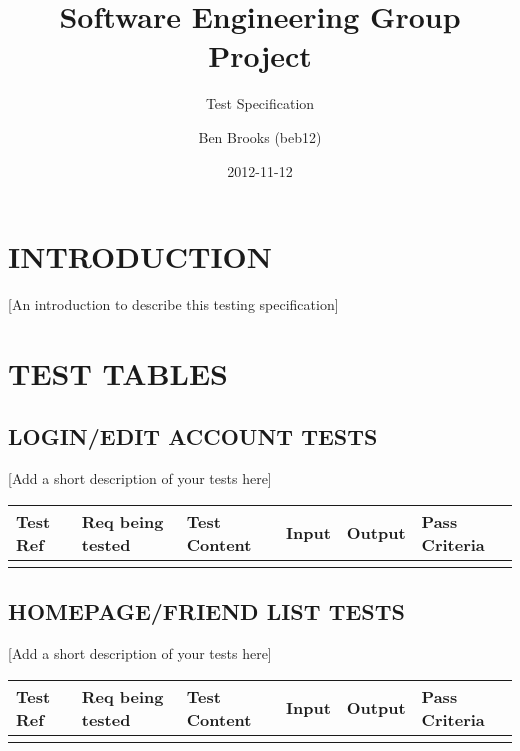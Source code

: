 \documentclass{project}
\begin{document}
\title{Software Engineering Group Project}
\subtitle{Test Specification}
\author{Ben Brooks (beb12)}
\date{2012-11-12}
\maketitle
\tableofcontents
\newpage


\section*{INTRODUCTION}
[An introduction to describe this testing specification]


\clearpage
{}
\section*{TEST TABLES}

\subsection*{LOGIN/EDIT ACCOUNT TESTS}
[Add a short description of your tests here]

\begin{tabular}{| p{2cm} | p{1cm} | p{2cm} | p{3cm} | p{3cm} | p{3cm} |}
\hline
Test Ref & Req being tested & Test Content & Input & Output & Pass Criteria \\
\hline
 &  &  &  &  &  \\
\hline
\end{tabular}

\subsection*{HOMEPAGE/FRIEND LIST TESTS}
[Add a short description of your tests here]

\begin{tabular}{| p{2cm} | p{1cm} | p{2cm} | p{3cm} | p{3cm} | p{3cm} |}
\hline
Test Ref & Req being tested & Test Content & Input & Output & Pass Criteria \\
\hline
 &  &  &  &  &  \\
\hline
\end{tabular}

\end{document}
